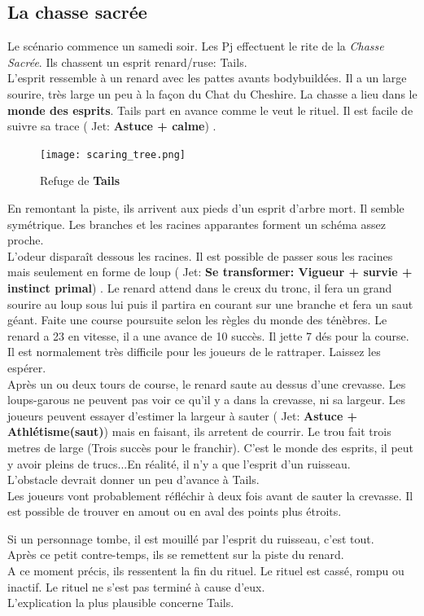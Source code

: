 \documentclass[oneside,12pt]{book}
\newcommand\roll[1]{
( Jet: \textbf{#1})
}
\begin{document}
\begin{flushleft}
\section{La chasse sacrée}
Le scénario commence un samedi soir.
Les Pj effectuent le rite de la \textit{Chasse Sacrée}. Ils chassent un esprit renard/ruse: Tails. \\
L'esprit ressemble à un renard avec les pattes avants bodybuildées. Il a un large sourire, très large un peu à la façon du Chat du Cheshire. La chasse a lieu dans le \textbf{monde des esprits}. Tails part en avance comme le veut le rituel. Il est facile de suivre sa trace \roll{Astuce + calme}.\\
\begin{figure}[!h]
\caption{\label{arbre_mort} Refuge de \textbf{Tails}}
\texttt{[image: scaring\_tree.png]}
\end{figure}
En remontant la piste, ils arrivent aux pieds d'un esprit d'arbre mort. Il semble symétrique. Les branches et les racines apparantes forment un schéma assez proche.\\ 
L'odeur disparaît dessous les racines. Il est possible de passer sous les racines mais seulement en forme de loup \roll{Se transformer: Vigueur + survie + instinct primal}. 
Le renard attend dans le creux du tronc, il fera un grand sourire au loup sous lui puis il partira en courant sur une branche et fera un saut géant. 
Faite une course poursuite selon les règles du monde des ténèbres. Le renard a 23 en vitesse, il a une avance de 10 succès. Il jette 7 dés pour la course. Il est normalement très difficile pour les joueurs de le rattraper. 
Laissez les espérer.\\ 
Après un ou deux tours de course, le renard saute au dessus d'une crevasse. 
Les loups-garous ne peuvent pas voir ce qu'il y a dans la crevasse, ni sa largeur. Les joueurs peuvent essayer d'estimer la largeur à sauter \roll{Astuce + Athlétisme(saut)} mais en faisant, ils arretent de courrir. 
Le trou fait trois metres de large (Trois succès pour le franchir). 
C'est le monde des esprits, il peut y avoir pleins de trucs...En réalité, il n'y a que l'esprit d'un ruisseau. \\ 
L'obstacle devrait donner un peu d'avance à Tails. \\
Les joueurs vont probablement réfléchir à deux fois avant de sauter la crevasse. Il est possible de trouver en amout ou en aval des points plus étroits.

Si un personnage tombe, il est mouillé par l'esprit du ruisseau, c'est tout.\\
Après ce petit contre-temps, ils se remettent sur la piste du renard.\\
A ce moment précis, ils ressentent la fin du rituel. Le rituel est cassé, rompu ou inactif. Le rituel ne s'est pas terminé à cause d'eux. \\
L'explication la plus plausible concerne Tails.


\end{flushleft}
\end{document}
